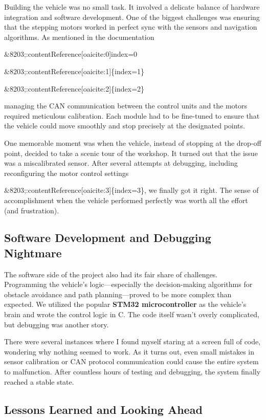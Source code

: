 \documentclass[a4paper]{article} 	%
\begin{document}
Building the vehicle was no small task. It involved a delicate balance of hardware integration and software development. One of the biggest challenges was ensuring that the stepping motors worked in perfect sync with the sensors and navigation algorithms. As mentioned in the documentation

$\&$8203;:contentReference[oaicite:0]{index=0}

$\&$8203;:contentReference[oaicite:1]\{index=1\}

$\&$8203;:contentReference[oaicite:2]\{index=2\}

managing the CAN communication between the control units and the motors required meticulous calibration. Each module had to be fine-tuned to ensure that the vehicle could move smoothly and stop precisely at the designated points.

One memorable moment was when the vehicle, instead of stopping at the drop-off point, decided to take a scenic tour of the workshop. It turned out that the issue was a miscalibrated sensor. After several attempts at debugging, including reconfiguring the motor control settings

$\&$8203;:contentReference[oaicite:3]\{index=3\}, we finally got it right. The sense of accomplishment when the vehicle performed perfectly was worth all the effort (and frustration).

\subsection*{Software Development and Debugging Nightmare}

The software side of the project also had its fair share of challenges. Programming the vehicle’s logic—especially the decision-making algorithms for obstacle avoidance and path planning—proved to be more complex than expected. We utilized the popular \textbf{STM32 microcontroller} as the vehicle’s brain and wrote the control logic in C. The code itself wasn’t overly complicated, but debugging was another story.

There were several instances where I found myself staring at a screen full of code, wondering why nothing seemed to work. As it turns out, even small mistakes in sensor calibration or CAN protocol communication could cause the entire system to malfunction. After countless hours of testing and debugging, the system finally reached a stable state.

\subsection*{Lessons Learned and Looking Ahead}
\end{document}
